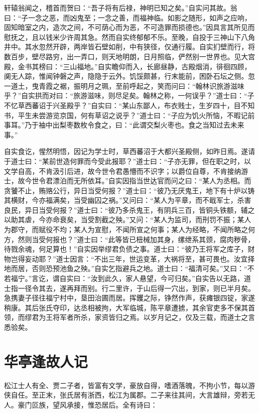 \documentclass[a4paper,12pt,UTF8,twoside]{ctexbook}
\begin{document}
轩辕翁闻之，稽首而贺曰：“吾子将有后禄，神明已知之矣。”自实问其故。翁曰：“子一念之恶，而凶鬼至；一念之善，而福神临。如影之随形，如声之应响，固知暗室之内，造次之间，不可荫心而为恶，不可造罪而损德也。”因具言其所见而慰抚之，且以钱米少许周其急。然而自实终郁郁不乐。至晚，自投于三神山下八角井中。其水忽然开辟，两岸皆石壁如削，中有狭径，仅通行履。自实扪壁而行，将数百步，壁尽路穷，出一弄口，则天地明朗，日月照临，俨然别一世界也。见大宫殿，金书其榜曰：“三山福地。”自实瞻仰而入，长廊昼静，古殿烟消，徘徊四顾，阒无人踪，惟闻钟磐之声，隐隐于云外。饥馁颇甚，行末能前，困卧石坛之侧。忽一道土，曳青霞之裾，振明月之珮，至前呼起之，笑而问曰：“翰林识旅游滋味乎？”自实拱而对曰：“旅游滋味，则尽足矣。翰林之称，一何误乎？”道士曰：“子不忆草西蕃诏于兴圣殿乎？”自实曰：“某山东鄙人，布衣贱士，生岁四十，目不知书，平生未尝游览京国，何有草诏之说乎？”道士曰：“子应为饥火所恼，不暇记前事耳。”乃于袖中出梨枣数枚令食之，曰：“此谓交梨火枣也。食之当知过去未来事。”

自实食讫，惺然明悟，因记为学士时，草西蕃沼于大都兴圣殿侧，如昨日焉。遂请于道士曰：“某前世造何罪而今受此报耶？”道士曰：“子亦无罪，但在职之时，以文学自高，不肯汲引后进，故今世令君愚懵而不识字；以爵位自尊，不肯接纳游士，故今世令君漂泊而无所依耳。”自实因指当世达官而问之曰：“某人为丞相。而贪饕不止，贿赂公行，异日当受何报？”道士曰：“彼乃无厌鬼王，地下有十炉以铸其横财，今亦福满矣，当受幽囚之祸。”又问曰：“某人为平章，而不戢军士，杀害良民，异日当受何报？”道士曰：“彼乃多杀鬼王，有阴兵三百，皆铜头铁额，辅之以助其虐，今亦命衰矣，当受割截之殃。”又问：“某人为监司，而刑罚不振；某人为郡守，而赋役不均；某人为宣慰，不闻所宣之何事；某人为经略，不闻所略之何方，然则当受何报也？”道士曰：“此等皆已杻械加其身，缧绁系其颈，腐肉秽骨，待戮余魂，何足算也！”自实因举缪君负债之事。道士曰：“彼乃王将军之库子，财物岂得妄动耶？”道士因言：“不出三年，世运变革，大祸将至，甚可畏也。汝宜择地而居，否则恐预池鱼之殃。”自实乞指避兵之地。道士曰：“福清可矣。”又曰：“不若福宁。”言讫，谓自实曰：“汝到此久，家人悬望，今可归矣。”自实告以无路，道士指一径令其去，遂再拜而别。行二里许，于山后得一穴出，到家，则已半月矣。急携妻子径往福宁村中，垦田治圃而居。挥钁之际，铮然作声，获瘫银四锭，家遂稍康。其后张氏夺印，达丞相被拘，大军临城，陈平章遭掳，其余官吏多不保其首领，而缪君为王将军者所杀，家资皆归之焉。以岁月记之，仅及三载，而道士之言悉验矣。

\chapter{华亭逢故人记}

松江士人有全、贾二子者，皆富有文学，豪放自得，嗜酒落魄，不拘小节，每以游侠自任。至正末，张氏居有浙西，松江为属郡。二子来往其间，大言雄辩，旁若无人。豪门叵族，望风承接，惟恐居后。全有诗曰：
\end{document}
